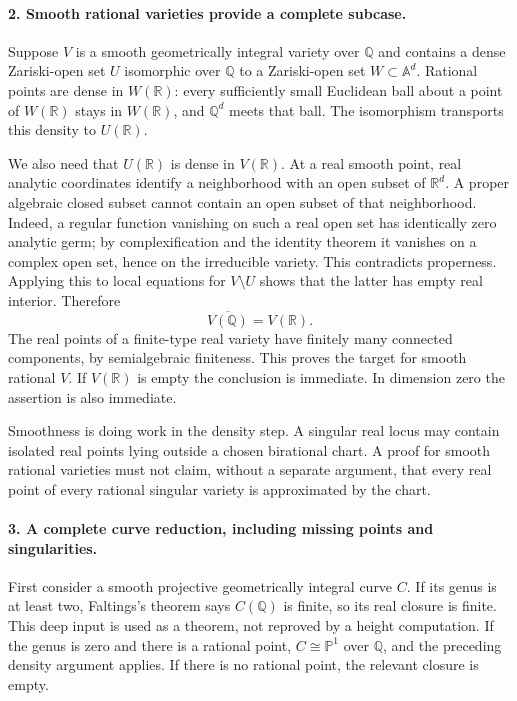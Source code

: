 \documentclass[11pt]{article}
\begin{document}
\paragraph{2. Smooth rational varieties provide a complete subcase.}
Suppose $V$ is a smooth geometrically integral variety over $\mathbb Q$ and contains a dense Zariski-open set $U$ isomorphic over $\mathbb Q$ to a Zariski-open set $W\subset\mathbb A^d$. Rational points are dense in $W(\mathbb R)$: every sufficiently small Euclidean ball about a point of $W(\mathbb R)$ stays in $W(\mathbb R)$, and $\mathbb Q^d$ meets that ball. The isomorphism transports this density to $U(\mathbb R)$.

We also need that $U(\mathbb R)$ is dense in $V(\mathbb R)$. At a real smooth point, real analytic coordinates identify a neighborhood with an open subset of $\mathbb R^d$. A proper algebraic closed subset cannot contain an open subset of that neighborhood. Indeed, a regular function vanishing on such a real open set has identically zero analytic germ; by complexification and the identity theorem it vanishes on a complex open set, hence on the irreducible variety. This contradicts properness. Applying this to local equations for $V\setminus U$ shows that the latter has empty real interior. Therefore
\[
 \overline{V(\mathbb Q)}=V(\mathbb R).
\]
The real points of a finite-type real variety have finitely many connected components, by semialgebraic finiteness. This proves the target for smooth rational $V$. If $V(\mathbb R)$ is empty the conclusion is immediate. In dimension zero the assertion is also immediate.

Smoothness is doing work in the density step. A singular real locus may contain isolated real points lying outside a chosen birational chart. A proof for smooth rational varieties must not claim, without a separate argument, that every real point of every rational singular variety is approximated by the chart.

\paragraph{3. A complete curve reduction, including missing points and singularities.}
First consider a smooth projective geometrically integral curve $C$. If its genus is at least two, Faltings's theorem says $C(\mathbb Q)$ is finite, so its real closure is finite. This deep input is used as a theorem, not reproved by a height computation. If the genus is zero and there is a rational point, $C\cong\mathbb P^1$ over $\mathbb Q$, and the preceding density argument applies. If there is no rational point, the relevant closure is empty.
\end{document}
